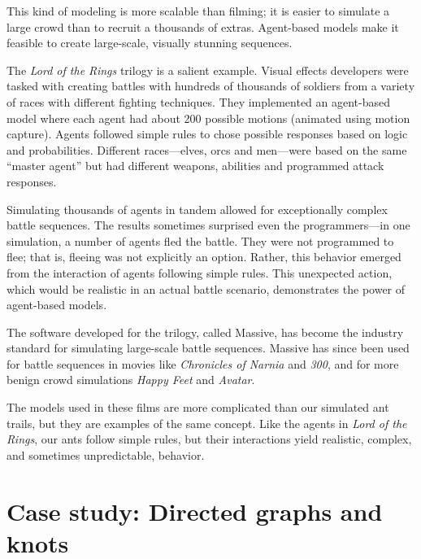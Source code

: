 \documentclass[10pt]{book}
\begin{document}
This kind of modeling is more scalable than filming; it is easier to
simulate a large crowd than to recruit a thousands of extras.
Agent-based models make it feasible to create large-scale, visually
stunning sequences.

The \emph{Lord of the Rings} trilogy is a salient example.  Visual
effects developers were tasked with creating battles with hundreds of
thousands of soldiers from a variety of races with different fighting
techniques.  They implemented an agent-based model where each agent
had about 200 possible motions (animated using motion capture).
Agents followed simple rules to chose possible responses based on
logic and probabilities.  Different races---elves, orcs and
men---were based on the same ``master agent'' but had different
weapons, abilities and programmed attack responses.

Simulating thousands of agents in tandem allowed for exceptionally
complex battle sequences.  The results sometimes surprised even the
programmers---in one simulation, a number of agents fled the battle.
They were not programmed to flee; that is, fleeing was not explicitly
an option.  Rather, this behavior emerged from the interaction of
agents following simple rules.
This unexpected action, which would be realistic in
an actual battle scenario, demonstrates the power of agent-based models.


The software developed for the trilogy, called Massive, has become the
industry standard for simulating large-scale battle sequences.
Massive has since been used for battle sequences in
movies like \emph{Chronicles of Narnia} and \emph{300}, and for
more benign crowd simulations \emph{Happy Feet} and
\emph{Avatar}.

The models used in these films are more complicated than our simulated
ant trails, but they are examples of the same concept.  Like the
agents in \emph{Lord of the Rings}, our ants follow simple rules, but
their interactions yield realistic, complex, and sometimes
unpredictable, behavior.


\chapter{Case study: Directed graphs and knots}
\end{document}
